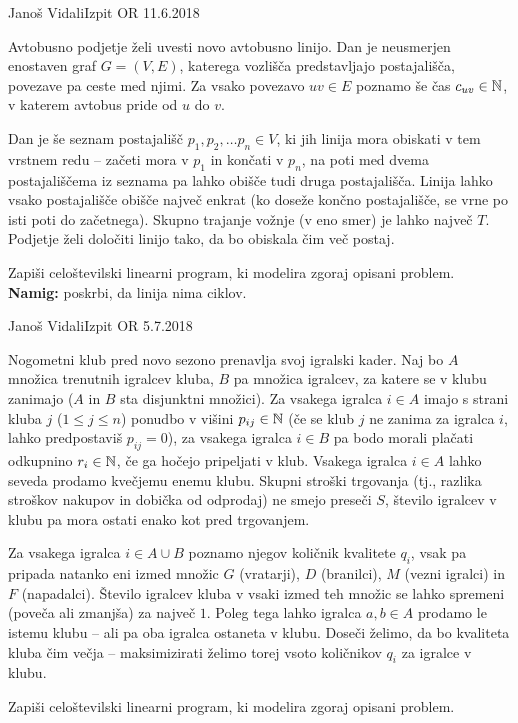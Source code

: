 \begin{naloga}{Janoš Vidali}{Izpit OR 11.6.2018}
\begin{vprasanje}
Avtobusno podjetje želi uvesti novo avtobusno linijo.
Dan je neusmerjen enostaven graf $G = (V, E)$,
katerega vozlišča predstavljajo postajališča,
povezave pa ceste med njimi.
Za vsako povezavo $uv \in E$ poznamo še čas $c_{uv} \in \mathbb{N}$,
v katerem avtobus pride od $u$ do $v$.

Dan je še seznam postajališč $p_1, p_2, \dots p_n \in V$,
ki jih linija mora obiskati v tem vrstnem redu
-- začeti mora v $p_1$ in končati v $p_n$,
na poti med dvema postajališčema iz seznama
pa lahko obišče tudi druga postajališča.
Linija lahko vsako postajališče obišče največ enkrat
(ko doseže končno postajališče, se vrne po isti poti do začetnega).
Skupno trajanje vožnje (v eno smer) je lahko največ $T$.
Podjetje želi določiti linijo tako, da bo obiskala čim več postaj.

Zapiši celoštevilski linearni program, ki modelira zgoraj opisani problem. \\
{\small {\bf Namig:} poskrbi, da linija nima ciklov.}
\end{vprasanje}
\begin{odgovor}
\end{odgovor}
\end{naloga}


\begin{naloga}{Janoš Vidali}{Izpit OR 5.7.2018}
\begin{vprasanje}
Nogometni klub pred novo sezono prenavlja svoj igralski kader.
Naj bo $A$ množica trenutnih igralcev kluba,
$B$ pa množica igralcev, za katere se v klubu zanimajo
($A$ in $B$ sta disjunktni množici).
Za vsakega igralca $i \in A$ imajo s strani kluba $j$ ($1 \le j \le n$)
ponudbo v višini $p_{ij} \in \mathbb{N}$
(če se klub $j$ ne zanima za igralca $i$, lahko predpostaviš $p_{ij} = 0$),
za vsakega igralca $i \in B$ pa bodo morali plačati odkupnino $r_i \in \mathbb{N}$,
če ga hočejo pripeljati v klub.
Vsakega igralca $i \in A$ lahko seveda prodamo kvečjemu enemu klubu.
Skupni stroški trgovanja
(tj., razlika stroškov nakupov in dobička od odprodaj)
ne smejo preseči $S$,
število igralcev v klubu pa mora ostati enako kot pred trgovanjem.

Za vsakega igralca $i \in A \cup B$ poznamo njegov količnik kvalitete $q_i$,
vsak pa pripada natanko eni izmed množic
$G$ (vratarji), $D$ (branilci), $M$ (vezni igralci) in $F$ (napadalci).
Število igralcev kluba v vsaki izmed teh množic se lahko spremeni
(poveča ali zmanjša) za največ $1$.
Poleg tega lahko igralca $a, b \in A$ prodamo le istemu klubu
-- ali pa oba igralca ostaneta v klubu.
Doseči želimo, da bo kvaliteta kluba čim večja
-- maksimizirati želimo torej vsoto količnikov $q_i$ za igralce v klubu.

Zapiši celoštevilski linearni program, ki modelira zgoraj opisani problem.
\end{vprasanje}
\begin{odgovor}
\end{odgovor}
\end{naloga}
